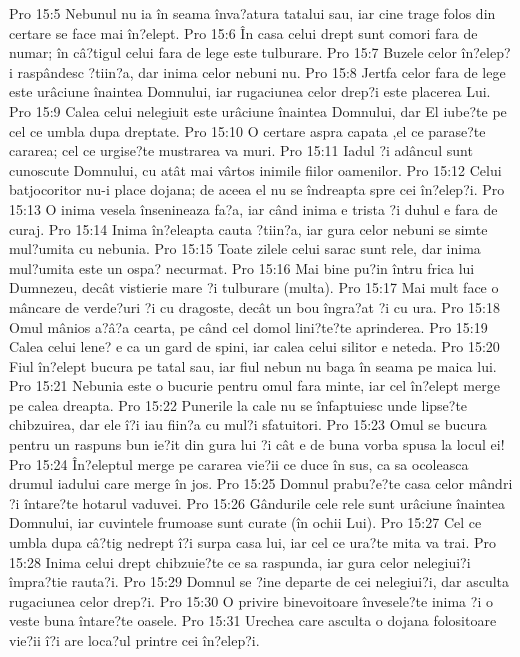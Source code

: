 Pro 15:5  Nebunul nu ia în seama înva?atura tatalui sau, iar cine trage folos din certare se face mai în?elept.
Pro 15:6  În casa celui drept sunt comori fara de numar; în câ?tigul celui fara de lege este tulburare.
Pro 15:7  Buzele celor în?elep?i raspândesc ?tiin?a, dar inima celor nebuni nu.
Pro 15:8  Jertfa celor fara de lege este urâciune înaintea Domnului, iar rugaciunea celor drep?i este placerea Lui.
Pro 15:9  Calea celui nelegiuit este urâciune înaintea Domnului, dar El iube?te pe cel ce umbla dupa dreptate.
Pro 15:10  O certare aspra capata ,el ce parase?te cararea; cel ce urgise?te mustrarea va muri.
Pro 15:11  Iadul ?i adâncul sunt cunoscute Domnului, cu atât mai vârtos inimile fiilor oamenilor.
Pro 15:12  Celui batjocoritor nu-i place dojana; de aceea el nu se îndreapta spre cei în?elep?i.
Pro 15:13  O inima vesela însenineaza fa?a, iar când inima e trista ?i duhul e fara de curaj.
Pro 15:14  Inima în?eleapta cauta ?tiin?a, iar gura celor nebuni se simte mul?umita cu nebunia.
Pro 15:15  Toate zilele celui sarac sunt rele, dar inima mul?umita este un ospa? necurmat.
Pro 15:16  Mai bine pu?in întru frica lui Dumnezeu, decât vistierie mare ?i tulburare (multa).
Pro 15:17  Mai mult face o mâncare de verde?uri ?i cu dragoste, decât un bou îngra?at ?i cu ura.
Pro 15:18  Omul mânios a?â?a cearta, pe când cel domol lini?te?te aprinderea.
Pro 15:19  Calea celui lene? e ca un gard de spini, iar calea celui silitor e neteda.
Pro 15:20  Fiul în?elept bucura pe tatal sau, iar fiul nebun nu baga în seama pe maica lui.
Pro 15:21  Nebunia este o bucurie pentru omul fara minte, iar cel în?elept merge pe calea dreapta.
Pro 15:22  Punerile la cale nu se înfaptuiesc unde lipse?te chibzuirea, dar ele î?i iau fiin?a cu mul?i sfatuitori.
Pro 15:23  Omul se bucura pentru un raspuns bun ie?it din gura lui ?i cât e de buna vorba spusa la locul ei!
Pro 15:24  În?eleptul merge pe cararea vie?ii ce duce în sus, ca sa ocoleasca drumul iadului care merge în jos.
Pro 15:25  Domnul prabu?e?te casa celor mândri ?i întare?te hotarul vaduvei.
Pro 15:26  Gândurile cele rele sunt urâciune înaintea Domnului, iar cuvintele frumoase sunt curate (în ochii Lui).
Pro 15:27  Cel ce umbla dupa câ?tig nedrept î?i surpa casa lui, iar cel ce ura?te mita va trai.
Pro 15:28  Inima celui drept chibzuie?te ce sa raspunda, iar gura celor nelegiui?i împra?tie rauta?i.
Pro 15:29  Domnul se ?ine departe de cei nelegiui?i, dar asculta rugaciunea celor drep?i.
Pro 15:30  O privire binevoitoare învesele?te inima ?i o veste buna întare?te oasele.
Pro 15:31  Urechea care asculta o dojana folositoare vie?ii î?i are loca?ul printre cei în?elep?i.
